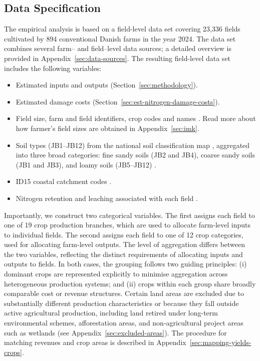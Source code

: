 \documentclass[12pt]{article}
\begin{document}
\subsection{Data Specification}
\label{Data Specification}
The empirical analysis is based on a field-level data set covering 23,336 fields cultivated by 894 conventional Danish farms in the year 2024. 
The data set combines several farm-- and field--level data sources; a detailed overview is provided in Appendix~\ref{sec:data-sources}.
The resulting field-level data set includes the following variables:
\begin{itemize}
    \item Estimated inputs and outputs (Section~\ref{sec:methodology}).
    \item Estimated damage costs (Section~\ref{sec:est-nitrogen-damage-costs}).
    \item Field size, farm and field identifiers, crop codes and names \citep{landbrugsstyrelsen2026e}. 
    Read more about how farmer's field sizes are obtained in Appendix~\ref{sec:imk}.
    \item Soil types (JB1--JB12) from the national soil classification map \citep{landbrugsstyrelsen2026c}, aggregated into three broad categories: fine sandy soils (JB2 and JB4), coarse sandy soils (JB1 and JB3), and loamy soils (JB5--JB12) \citep{jordbundstyper2024}.
    \item ID15 coastal catchment codes \citep{landbrugsstyrelsen2026d}.
    \item Nitrogen retention and leaching associated with each field \citep{Hojberg2025,Olsen2026,OlsenNd}.
\end{itemize}
Importantly, we construct two categorical variables. 
The first assigns each field to one of 19 crop production branches, which are used to allocate farm-level inputs to individual fields. 
The second assigns each field to one of 12 crop categories, used for allocating farm-level outputs. 
The level of aggregation differs between the two variables, reflecting the distinct requirements of allocating inputs and outputs to fields. 
In both cases, the grouping follows two guiding principles: (i) dominant crops are represented explicitly to minimise aggregation across heterogeneous production systems; and (ii) crops within each group share broadly comparable cost or revenue structures.  
Certain land areas are excluded due to substantially different production characteristics or because they fall outside active agricultural production, including land retired under long-term environmental schemes, afforestation areas, and non-agricultural project areas such as wetlands (see Appendix~\ref{sec:excluded-areas}).
The procedure for matching revenues and crop areas is described in Appendix~\ref{sec:mapping-yields-crops}.
\end{document}
